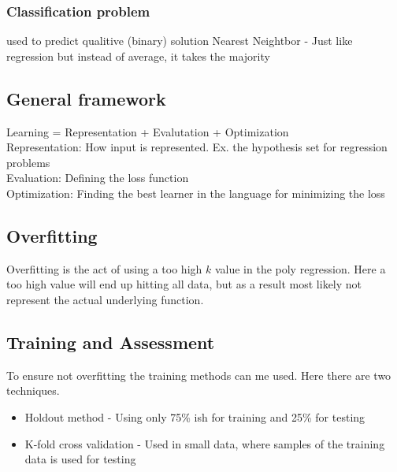 \documentclass[12pt, a4paper]{article}
\begin{document}
				\subsubsection{Classification problem}
					used to predict qualitive (binary) solution
					Nearest Neightbor - Just like regression but instead of average, it takes the majority
			\subsection{General framework}
				Learning = Representation + Evalutation + Optimization\\
				Representation: How input is represented. Ex. the hypothesis set for regression problems\\
				Evaluation: Defining the loss function\\
				Optimization: Finding the best learner in the language for minimizing the loss
			\subsection{Overfitting}
				Overfitting is the act of using a too high $k$ value in the poly regression. Here a too high value will end up hitting all data, but as a result most likely not represent the actual underlying function.
			\subsection{Training and Assessment}
				To ensure not overfitting the training methods can me used. Here there are two techniques.\\
				\begin{itemize}
					\item Holdout method - Using only 75\% ish for training and 25\% for testing
					\item K-fold cross validation - Used in small data, where samples of the training data is used for testing
				\end{itemize}
\end{document}
